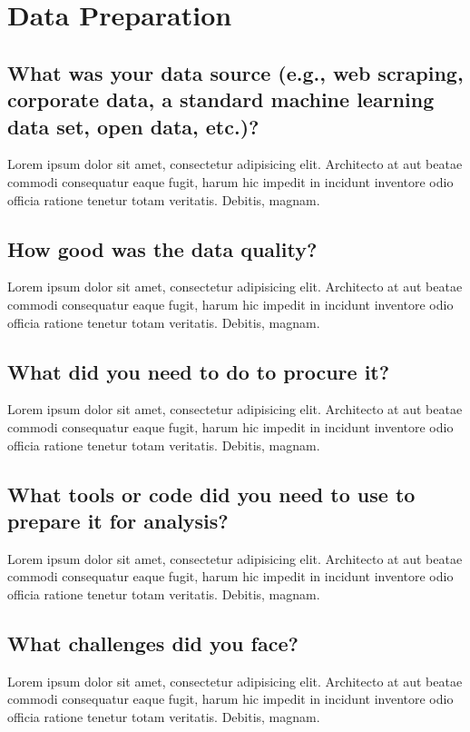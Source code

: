 \section{Data Preparation}

\subsection{What was your data source (e.g., web scraping, corporate data, a standard machine learning data set, open data, etc.)?}

Lorem ipsum dolor sit amet, consectetur adipisicing elit. Architecto at aut beatae commodi consequatur eaque fugit, harum hic impedit in incidunt inventore odio officia ratione tenetur totam veritatis. Debitis, magnam.

\subsection{How good was the data quality?}

Lorem ipsum dolor sit amet, consectetur adipisicing elit. Architecto at aut beatae commodi consequatur eaque fugit, harum hic impedit in incidunt inventore odio officia ratione tenetur totam veritatis. Debitis, magnam.

\subsection{What did you need to do to procure it?}

Lorem ipsum dolor sit amet, consectetur adipisicing elit. Architecto at aut beatae commodi consequatur eaque fugit, harum hic impedit in incidunt inventore odio officia ratione tenetur totam veritatis. Debitis, magnam.

\subsection{What tools or code did you need to use to prepare it for analysis?}

Lorem ipsum dolor sit amet, consectetur adipisicing elit. Architecto at aut beatae commodi consequatur eaque fugit, harum hic impedit in incidunt inventore odio officia ratione tenetur totam veritatis. Debitis, magnam.

\subsection{What challenges did you face?}

Lorem ipsum dolor sit amet, consectetur adipisicing elit. Architecto at aut beatae commodi consequatur eaque fugit, harum hic impedit in incidunt inventore odio officia ratione tenetur totam veritatis. Debitis, magnam.

